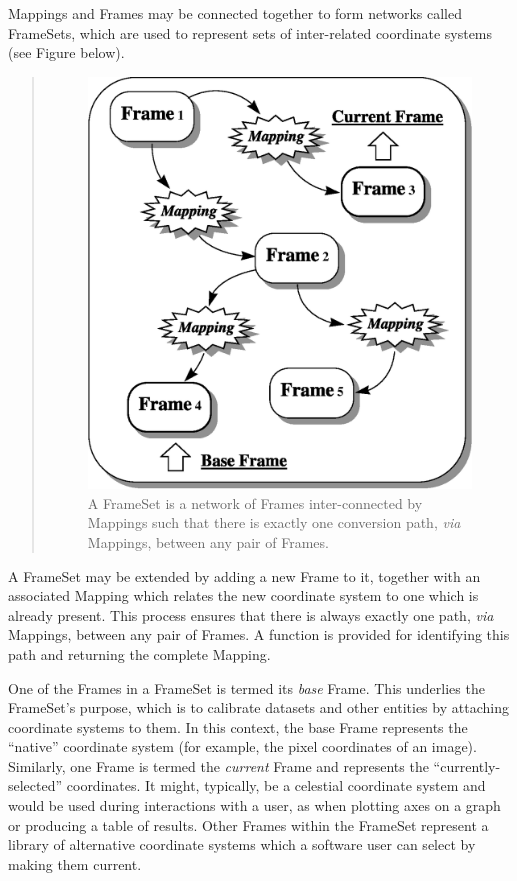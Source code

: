 \documentclass[twoside,11pt]{article}
\newcommand{\htmlref}[2]{#1}
\begin{document}
\begin{htmlonly}
   Mappings and Frames may be connected together to form networks called
   FrameSets, which are used to represent sets of inter-related
   coordinate systems (see Figure below).
   \begin{quote}
   \begin{figure}
   \label{fig:frameset}
   \includegraphics[scale=1.0]{sun211_figures/frameset.eps}
   \caption{A FrameSet is a network of Frames inter-connected by Mappings
   such that there is exactly one conversion path, {\em{via}} Mappings,
   between any pair of Frames.}
   \end{figure}
   \end{quote}
\end{htmlonly}
A FrameSet may be extended by adding a new \htmlref{Frame}{Frame} to it, together with
an associated \htmlref{Mapping}{Mapping} which relates the new coordinate system to one
which is already present.  This process ensures that there is always
exactly one path, {\em{via}} Mappings, between any pair of Frames.  A
function is provided for identifying this path and returning the
complete Mapping.

One of the Frames in a FrameSet is termed its {\em{base}} Frame.  This
underlies the FrameSet's purpose, which is to calibrate datasets and
other entities by attaching coordinate systems to them.  In this
context, the base Frame represents the ``native'' coordinate system
(for example, the pixel coordinates of an image).  Similarly, one
Frame is termed the {\em{current}} Frame and represents the
``currently-selected'' coordinates.  It might, typically, be a
celestial coordinate system and would be used during interactions with
a user, as when plotting axes on a graph or producing a table of
results.  Other Frames within the FrameSet represent a library of
alternative coordinate systems which a software user can select by
making them current.
\end{document}
